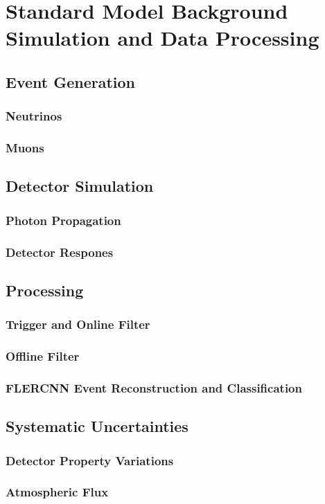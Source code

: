 \setchapterpreamble[u]{\margintoc}

\chapter{Standard Model Background Simulation and Data Processing}



\section{Event Generation}

\subsection{Neutrinos}

\subsection{Muons}



\section{Detector Simulation}

\subsection{Photon Propagation}

\subsection{Detector Respones}


\section{Processing}

\subsection{Trigger and Online Filter}

\subsection{Offline Filter}

\subsection{FLERCNN Event Reconstruction and Classification}


\section{Systematic Uncertainties}

\subsection{Detector Property Variations}

\subsection{Atmospheric Flux}
